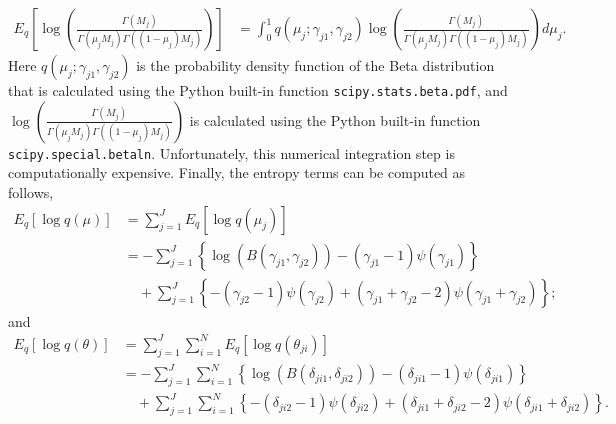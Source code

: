 \documentclass[11pt,reqno]{amsart}
\begin{document}
\begin{equation}\label{eqn:integration}
\begin{split}
E_q\left[ \log \left( \frac{ \Gamma(M_j) } { \Gamma(\mu_j M_j) \Gamma((1-\mu_j)M_j ) }\right)\right] &= \int_{0}^{1} q(\mu_j;\gamma_{j1}, \gamma_{j2}) \log \left( \frac{ \Gamma(M_j) } { \Gamma(\mu_j M_j) \Gamma((1-\mu_j)M_j ) }\right) d\mu_j.
\end{split}
\end{equation}
Here $q(\mu_j;\gamma_{j1}, \gamma_{j2})$ is the probability density function of the Beta distribution that is calculated using the Python built-in function \texttt{scipy.stats.beta.pdf},
and $\log \left( \frac{ \Gamma(M_j) } { \Gamma(\mu_j M_j) \Gamma((1-\mu_j)M_j ) }\right)$ is calculated using the Python built-in function \texttt{scipy.special.betaln}.
Unfortunately, this numerical integration step is computationally expensive.
%
Finally, the entropy terms can be computed as follows,
\begin{equation}
\begin{split}
E_q \left[ \log q\left(\mu \right)\right] &= \sum_{j=1}^{J} E_q \left[ \log q(\mu_j)\right] \\
&= -\sum_{j=1}^{J} \left\lbrace \log (B(\gamma_{j1},\gamma_{j2})) -(\gamma_{j1}-1)\psi(\gamma_{j1}) \right\rbrace \\
&\quad  + \sum_{j=1}^{J} \left\lbrace -(\gamma_{j2}-1)\psi(\gamma_{j2}) + (\gamma_{j1}+\gamma_{j2}-2)\psi(\gamma_{j1}+\gamma_{j2})\right\rbrace;
\end{split}
\end{equation}
and
\begin{equation}
\begin{split}
E_q \left[ \log q\left(\theta \right)\right] &= \sum_{j=1}^{J}\sum_{i=1}^{N} E_q\left[ \log q(\theta_{ji})\right] \\
&= -\sum_{j=1}^{J}\sum_{i=1}^{N} \left\lbrace \log (B(\delta_{ji1},\delta_{ji2}))-(\delta_{ji1}-1)\psi(\delta_{ji1}) \right\rbrace \\
&\quad + \sum_{j=1}^{J}\sum_{i=1}^{N} \left\lbrace -(\delta_{ji2}-1)\psi(\delta_{ji2}) + (\delta_{ji1}+\delta_{ji2}-2)\psi(\delta_{ji1}+\delta_{ji2})\right\rbrace.
\end{split}
\end{equation}
%
\end{document}
